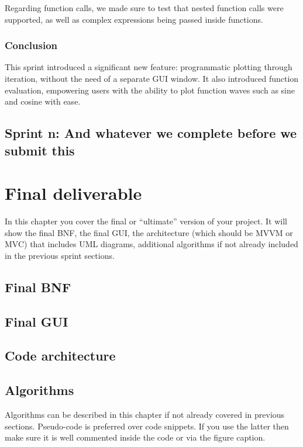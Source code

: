 \documentclass[a4paper, oneside, 11pt]{report}
\begin{document}
Regarding function calls, we made sure to test that nested function calls were supported, as well as complex expressions being passed inside functions.

\subsection{Conclusion}
This sprint introduced a significant new feature: programmatic plotting through iteration, without the need of a separate GUI window. It also introduced function evaluation, empowering users with the ability to plot function waves such as sine and cosine with ease.

\section{Sprint n: And whatever we complete before we submit this}



\chapter{Final deliverable}\label{Impl}

In this chapter you cover the final or ``ultimate'' version of your project. It will show the final BNF, the final GUI, the architecture (which should be MVVM or MVC) that includes UML diagrams, additional algorithms if not already included in the previous sprint sections.

\section{Final BNF}

\section{Final GUI}

\section{Code architecture}
\label{code-arch}

\section{Algorithms}

Algorithms can be described in this chapter if not already covered in previous sections. Pseudo-code is preferred over code snippets. If you use the latter then make sure it is well commented inside the code or via the figure caption. 
\end{document}
